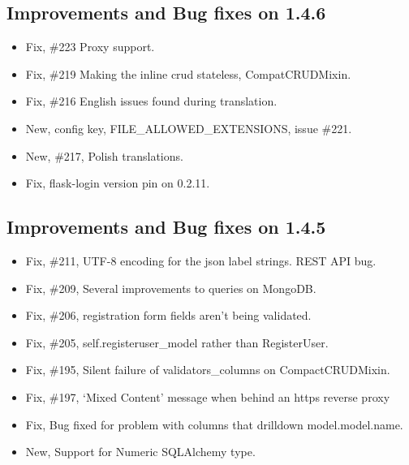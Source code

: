 \documentclass[letterpaper,10pt,english]{sphinxmanual}
\begin{document}
\subsection{Improvements and Bug fixes on 1.4.6}
\label{versions:improvements-and-bug-fixes-on-1-4-6}\begin{itemize}
\item {} 
Fix, \#223 Proxy support.

\item {} 
Fix, \#219 Making the inline crud stateless, CompatCRUDMixin.

\item {} 
Fix, \#216 English issues found during translation.

\item {} 
New, config key, FILE\_ALLOWED\_EXTENSIONS, issue \#221.

\item {} 
New, \#217, Polish translations.

\item {} 
Fix, flask-login version pin on 0.2.11.

\end{itemize}


\subsection{Improvements and Bug fixes on 1.4.5}
\label{versions:improvements-and-bug-fixes-on-1-4-5}\begin{itemize}
\item {} 
Fix, \#211, UTF-8 encoding for the json label strings. REST API bug.

\item {} 
Fix, \#209, Several improvements to queries on MongoDB.

\item {} 
Fix, \#206, registration form fields aren't being validated.

\item {} 
Fix, \#205, self.registeruser\_model rather than RegisterUser.

\item {} 
Fix, \#195, Silent failure of validators\_columns on CompactCRUDMixin.

\item {} 
Fix, \#197, `Mixed Content' message when behind an https reverse proxy

\item {} 
Fix, Bug fixed for problem with columns that drilldown model.model.name.

\item {} 
New, Support for Numeric SQLAlchemy type.

\end{itemize}
\end{document}
